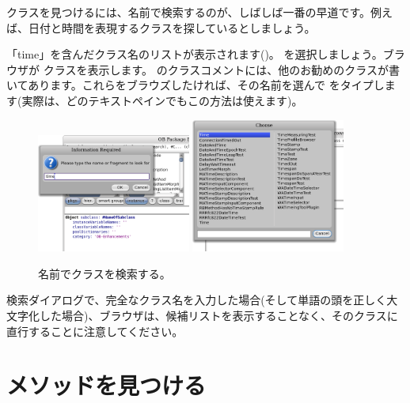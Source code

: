 \documentclass[a4paper,10pt,twoside]{book}
\begin{document}
クラスを見つけるには、名前で検索するのが、しばしば一番の早道です。例えば、日付と時間を表現するクラスを探しているとしましょう。

\noindent
「time」を含んだクラス名のリストが表示されます()。 を選択しましょう。ブラウザが  クラスを表示します。 のクラスコメントには、他のお勧めのクラスが書いてあります。これらをブラウズしたければ、その名前を選んで  をタイプします(実際は、どのテキストペインでもこの方法は使えます)。

\begin{figure}[hbt]
\centerline{
	\includegraphics[width=0.45\textwidth]{FindIt}
	\hspace{1cm}
	\includegraphics[width=0.45\textwidth]{TimeClasses}
}
\caption{名前でクラスを検索する。
}
\end{figure}

検索ダイアログで、完全なクラス名を入力した場合(そして単語の頭を正しく大文字化した場合)、ブラウザは、候補リストを表示することなく、そのクラスに直行することに注意してください。

\section{メソッドを見つける}
\end{document}
